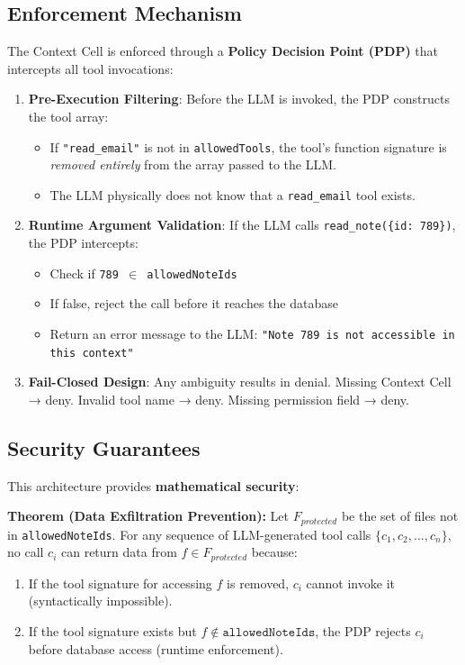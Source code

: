 \subsection{Enforcement Mechanism}

The Context Cell is enforced through a \textbf{Policy Decision Point (PDP)} that intercepts all tool invocations:

\begin{enumerate}
    \item \textbf{Pre-Execution Filtering}: Before the LLM is invoked, the PDP constructs the tool array:
    \begin{itemize}
        \item If \texttt{"read\_email"} is not in \texttt{allowedTools}, the tool's function signature is \textit{removed entirely} from the array passed to the LLM.
        \item The LLM physically does not know that a \texttt{read\_email} tool exists.
    \end{itemize}

    \item \textbf{Runtime Argument Validation}: If the LLM calls \texttt{read\_note(\{id: 789\})}, the PDP intercepts:
    \begin{itemize}
        \item Check if \texttt{789 $\in$ allowedNoteIds}
        \item If false, reject the call before it reaches the database
        \item Return an error message to the LLM: \texttt{"Note 789 is not accessible in this context"}
    \end{itemize}

    \item \textbf{Fail-Closed Design}: Any ambiguity results in denial. Missing Context Cell → deny. Invalid tool name → deny. Missing permission field → deny.
\end{enumerate}

\subsection{Security Guarantees}

This architecture provides \textbf{mathematical security}:

\textbf{Theorem (Data Exfiltration Prevention):} Let $F_{protected}$ be the set of files not in \texttt{allowedNoteIds}. For any sequence of LLM-generated tool calls $\{c_1, c_2, ..., c_n\}$, no call $c_i$ can return data from $f \in F_{protected}$ because:
\begin{enumerate}
    \item If the tool signature for accessing $f$ is removed, $c_i$ cannot invoke it (syntactically impossible).
    \item If the tool signature exists but $f \notin \texttt{allowedNoteIds}$, the PDP rejects $c_i$ before database access (runtime enforcement).
\end{enumerate}

